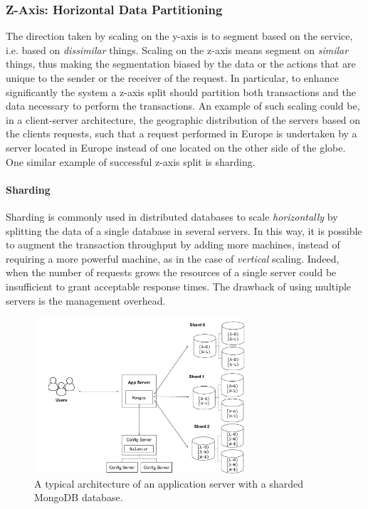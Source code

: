 \subsubsection{Z-Axis: Horizontal Data Partitioning}
\label{sec:z-axis}

The direction taken by scaling on the y-axis is to segment based on the service,
i.e. based on \emph{dissimilar} things. Scaling on the z-axis means segment on
\emph{similar} things, thus making the segmentation biased by the data or the
actions that are unique to the sender or the receiver of the request. In
particular, to enhance significantly the system a z-axis split should partition
both transactions and the data necessary to perform the transactions. An example
of such scaling could be, in a client-server architecture, the geographic
distribution of the servers based on the clients requests, such that a request
performed in Europe is undertaken by a server located in Europe instead of one
located on the other side of the globe. One similar example of successful z-axis
split is sharding.

\paragraph{Sharding}
Sharding is commonly used in distributed databases to scale \emph{horizontally}
by splitting the data of a single database in several servers. In this way, it
is possible to augment the transaction throughput by adding more machines,
instead of requiring a more powerful machine, as in the case of \emph{vertical}
scaling.
Indeed, when the number of requests grows the resources of a single server
could be insufficient to grant acceptable response times. The drawback of using
multiple servers is the management overhead.


\begin{figure}
  \begin{center}
    \includegraphics[width=0.7\textwidth]{./res/img/mongodb}
    \caption{A typical architecture of an application server with a sharded
    MongoDB database.}
    \label{fig:mongodb}
  \end{center}
\end{figure}

